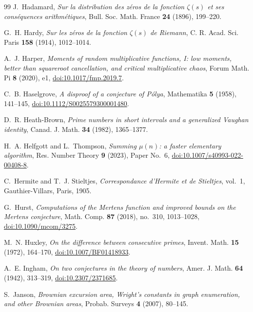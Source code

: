 \documentclass[11pt,reqno]{amsart}
\numberwithin{equation}{section}
\theoremstyle{plain}
\theoremstyle{definition}
\theoremstyle{remark}
\begin{document}
\begin{thebibliography}{99}
J.~Hadamard, \emph{Sur la distribution des z\'eros de la fonction $\zeta(s)$
et ses cons\'equences arithm\'etiques}, Bull. Soc. Math. France \textbf{24}
(1896), 199--220.

G.~H. Hardy, \emph{Sur les z\'eros de la fonction $\zeta(s)$ de Riemann},
C. R. Acad. Sci. Paris \textbf{158} (1914), 1012--1014.

A.~J. Harper, \emph{Moments of random multiplicative functions, I: low
moments, better than squareroot cancellation, and critical multiplicative
chaos}, Forum Math. Pi \textbf{8} (2020), e1,
\href{https://doi.org/10.1017/fmp.2019.7}{doi:10.1017/fmp.2019.7}.

C.~B. Haselgrove, \emph{A disproof of a conjecture of P\'olya}, Mathematika
\textbf{5} (1958), 141--145,
\href{https://doi.org/10.1112/S0025579300001480}{doi:10.1112/S0025579300001480}.

D.~R. Heath-Brown, \emph{Prime numbers in short intervals and a generalized
Vaughan identity}, Canad. J. Math. \textbf{34} (1982), 1365--1377.

H.~A. Helfgott and L.~Thompson, \emph{Summing $\mu(n)$: a faster elementary
algorithm}, Res. Number Theory \textbf{9} (2023), Paper No.~6,
\href{https://doi.org/10.1007/s40993-022-00408-8}{doi:10.1007/s40993-022-00408-8}.

C.~Hermite and T.~J. Stieltjes, \emph{Correspondance d'Hermite et de
Stieltjes}, vol.~1, Gauthier-Villars, Paris, 1905.

G.~Hurst, \emph{Computations of the Mertens function and improved bounds on
the Mertens conjecture}, Math. Comp. \textbf{87} (2018), no.~310, 1013--1028,
\href{https://doi.org/10.1090/mcom/3275}{doi:10.1090/mcom/3275}.

M.~N. Huxley, \emph{On the difference between consecutive primes}, Invent.
Math. \textbf{15} (1972), 164--170,
\href{https://doi.org/10.1007/BF01418933}{doi:10.1007/BF01418933}.

A.~E. Ingham, \emph{On two conjectures in the theory of numbers}, Amer. J.
Math. \textbf{64} (1942), 313--319,
\href{https://doi.org/10.2307/2371685}{doi:10.2307/2371685}.

S.~Janson, \emph{Brownian excursion area, Wright's constants in graph
enumeration, and other Brownian areas}, Probab. Surveys \textbf{4} (2007),
80--145.


\end{thebibliography}
\end{document}
